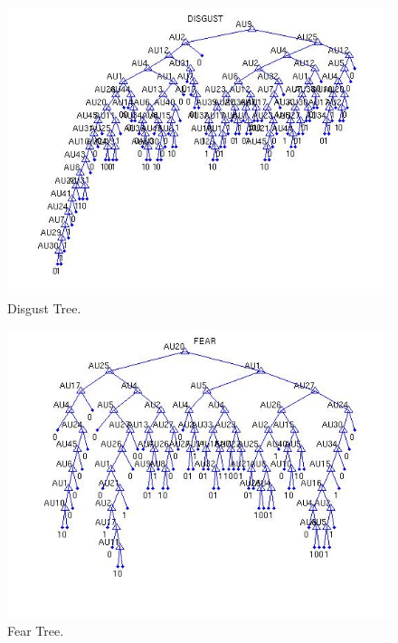 \documentclass[a4paper,12pt,oneside,final]{report}
\newenvironment{changemargin}[2]{\begin{list}{}{%
\setlength{\topsep}{0pt}%
\setlength{\leftmargin}{0pt}%
\setlength{\rightmargin}{0pt}%
\setlength{\listparindent}{\parindent}%
\setlength{\itemindent}{\parindent}%
\setlength{\parsep}{0pt plus 1pt}%
\addtolength{\leftmargin}{#1}%
\addtolength{\rightmargin}{#2}%
}\item }{\end{list}}
\begin{document}
\begin{figure}[!h]
\begin{changemargin}{-20mm}{-20mm}
\center
\includegraphics[scale=0.6]{disgust.jpg}
\caption{Disgust Tree.}
\end{changemargin}
\end{figure}

\begin{figure}[!h]
\center
\includegraphics[scale=0.6]{fear.jpg}
\caption{Fear Tree.}
\end{figure}
\end{document}
